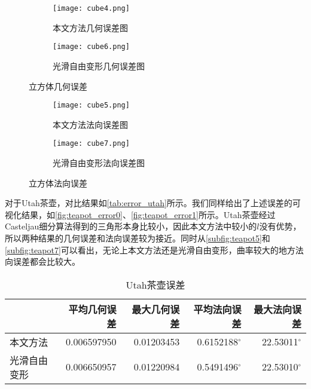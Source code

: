 \begin{figure}[htbp]
	\centering
	\begin{subfigure}[b]{.45\textwidth}
		\centering
		\texttt{[image: cube4.png]}
		\caption{本文方法几何误差图}\label{subfig:cube4}
	\end{subfigure}%
	\begin{subfigure}[b]{.45\textwidth}
		\centering
		\texttt{[image: cube6.png]}
		\caption{光滑自由变形几何误差图}\label{subfig:cube6}
	\end{subfigure}
	\caption{立方体几何误差}\label{fig:cube_error0}
\end{figure}
\begin{figure}[htbp]
	\centering
	\begin{subfigure}[b]{.45\textwidth}
		\centering
		\texttt{[image: cube5.png]}
		\caption{本文方法法向误差图}\label{subfig:cube5}
	\end{subfigure}%
	\begin{subfigure}[b]{.45\textwidth}
		\centering
		\texttt{[image: cube7.png]}
		\caption{光滑自由变形法向误差图}\label{subfig:cube7}
	\end{subfigure}
	\caption{立方体法向误差}\label{fig:cube_error1}
\end{figure}

对于Utah茶壶，对比结果如\autoref{tab:error_utah}所示。我们同样给出了上述误差的可视化结果，如\autoref{fig:teapot_error0}、\autoref{fig:teapot_error1}所示。Utah茶壶经过Casteljau细分算法得到的三角形本身比较小，因此本文方法中较小的$l$没有优势，所以两种结果的几何误差和法向误差较为接近。同时从\autoref{subfig:teapot5}和\autoref{subfig:teapot7}可以看出，无论上本文方法还是光滑自由变形，曲率较大的地方法向误差都会比较大。

\begin{table}[htbp]
    \centering
    \begin{tabular}{lrrrr}
    \toprule
        & 平均几何误差 & 最大几何误差 & 平均法向误差 & 最大法向误差 \\
    \midrule
        本文方法    & \num{0.006597950} & \num{0.01203453} & \num[scientific-notation=false]{0.6152188}$^\circ$ & \num[scientific-notation=false]{22.53011}$^\circ$ \\
        光滑自由变形& \num{0.006650957} & \num{0.01220984} & \num[scientific-notation=false]{0.5491496}$^\circ$ & \num[scientific-notation=false]{22.53010}$^\circ$ \\
    \bottomrule
    \end{tabular}
    \caption{Utah茶壶误差} \label{tab:error_utah}
\end{table}

